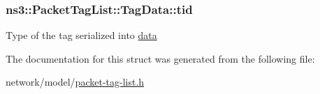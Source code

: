 \subsubsection[{\texorpdfstring{tid}{tid}}]{ ns3\+::\+Packet\+Tag\+List\+::\+Tag\+Data\+::tid}\hypertarget{structns3_1_1PacketTagList_1_1TagData_a5086e334de32e4eee36059907e5d2197}{}\label{structns3_1_1PacketTagList_1_1TagData_a5086e334de32e4eee36059907e5d2197}
Type of the tag serialized into \hyperlink{structns3_1_1PacketTagList_1_1TagData_adb4e85fe6e4a21a95c184b55ef9a8ff4}{data} 

The documentation for this struct was generated from the following file\+:\begin{DoxyCompactItemize}
\item 
network/model/\hyperlink{packet-tag-list_8h}{packet-\/tag-\/list.\+h}\end{DoxyCompactItemize}
